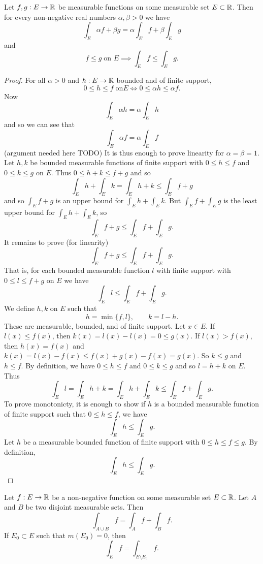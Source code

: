 \begin{theorem}
	Let $f, g: E \to \mathbb{R}$ be measurable functions on some
	measurable set $E \subset \mathbb{R}$.
	Then for every non-negative real numbers $\alpha, \beta > 0$
	we have
	\[
		\int_E \alpha f + \beta g
		= \alpha \int_E f + \beta \int_E g
	\]
	and
	\[
		f \leq g \;\text{on $E$}
		\implies \int_E f \leq \int_E g.
	\]
\end{theorem}

\begin{proof}
	For all $\alpha > 0$ and $h: E \to \mathbb{R}$ bounded and of finite support,
	\[
		0 \leq h \leq f \;\text{on} E
		\iff 0 \leq \alpha h \leq \alpha f.
	\]
	Now
	\[
		\int_E \alpha h = \alpha \int_E h
	\]
	and so we can see that
	\[
		\int_E \alpha f = \alpha \int_E f
	\]
	(argument needed here TODO) %
	It is thus enough to prove linearity for $\alpha = \beta = 1$.
	Let $h, k$ be bounded measurable functions of finite support with
	$0 \leq h \leq f$ and $0 \leq k \leq g$ on $E$.
	Thus $0 \leq h + k \leq f + g$ and so
	\[
		\int_E h + \int_E k
		= \int_E h + k
		\leq \int_E f + g
	\]
	and so $\int_E f + g$ is an upper bound for
	$\int_E h + \int_E k$.
	But $\int_E f + \int_E g$ is the least upper bound for
	$\int_E h + \int_E k$, so
	\[
		\int_E f + g \leq \int_E f + \int_E g.
	\]
	It remains to prove (for linearity)
	\[
		\int_E f + g \leq \int_E f + \int_E g.
	\]
	That is,
	for each bounded measurable function $l$ with finite support
	with $0 \leq l \leq f + g$ on $E$ we have
	\[
		\int_E l \leq \int_E f + \int_E g.
	\]
	We define $h, k$ on $E$ such that
	\[
		h = \min\{f,l\}, \qquad k = l - h.
	\]
	These are measurable, bounded, and of finite support.
	Let $x \in E$.
	If $l(x) \leq f(x)$, then $k(x) = l(x) - l(x) = 0 \leq g(x)$.
	If $l(x) > f(x)$, then $h(x) = f(x)$ and
	$k(x) = l(x) - f(x) \leq f(x) + g(x) - f(x) = g(x)$.
	So $k \leq g$ and $h \leq f$.
	By definition, we have $0 \leq h \leq f$
	and $0 \leq k \leq g$
	and so $l = h + k$ on $E$.
	Thus
	\[
		\int_E l
		= \int_E h + k
		= \int_E h + \int_E k
		\leq \int_E f + \int_E g.
	\]
	To prove monotonicty, it is enough to show if $h$ is a bounded measurable
	function of finite support such that $0 \leq h \leq f$, we have
	\[
		\int_E h \leq \int_E g.
	\]
	Let $h$ be a measurable bounded function of finite support
	with $0 \leq h \leq f \leq g$.
	By definition,
	\[
		\int_E h \leq \int_E g.
	\]
\end{proof}

\begin{theorem}
	Let $f: E \to \mathbb{R}$ be a non-negative function on some measurable
	set $E \subset \mathbb{R}$.
	Let $A$ and $B$ be two disjoint measurable sets.
	Then
	\[
		\int_{A \cup B} f = \int_A f + \int_B f.
	\]
	If $E_0 \subset E$ such that $m(E_0) = 0$,
	then
	\[
		\int_E f = \int_{E \setminus E_0} f.
	\]
\end{theorem}

